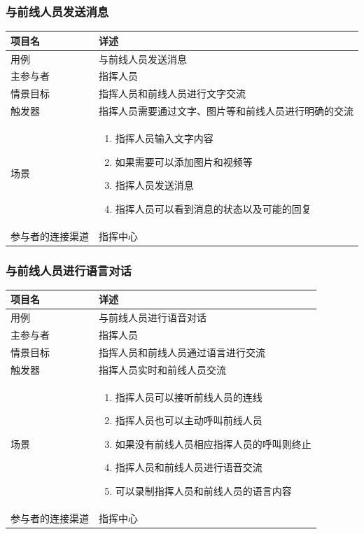 \documentclass{ctexrep}
\begin{document}
\subsubsection{与前线人员发送消息}
\begin{longtable}{p{2cm} | p{10cm}}
\hline
项目名 & 详述 \\
\hline
\hline
用例 & 与前线人员发送消息\\
\hline
主参与者 & 指挥人员 \\
\hline
情景目标 &  指挥人员和前线人员进行文字交流\\
\hline
触发器 &  指挥人员需要通过文字、图片等和前线人员进行明确的交流\\
\hline
场景 & \begin{enumerate}
	\item 指挥人员输入文字内容
	\item 如果需要可以添加图片和视频等
	\item 指挥人员发送消息
	\item 指挥人员可以看到消息的状态以及可能的回复
\end{enumerate} \\
\hline
参与者的连接渠道 & 指挥中心 \\
\hline
\end{longtable}

\subsubsection{与前线人员进行语言对话}
\begin{longtable}{p{2cm} | p{10cm}}
\hline
项目名 & 详述 \\
\hline
\hline
用例 & 与前线人员进行语音对话\\
\hline
主参与者 & 指挥人员 \\
\hline
情景目标 &  指挥人员和前线人员通过语言进行交流\\
\hline
触发器 &  指挥人员实时和前线人员交流\\
\hline
场景 & \begin{enumerate}
	\item 指挥人员可以接听前线人员的连线
	\item 指挥人员也可以主动呼叫前线人员
	\item 如果没有前线人员相应指挥人员的呼叫则终止
	\item 指挥人员和前线人员进行语音交流
	\item 可以录制指挥人员和前线人员的语言内容
\end{enumerate} \\
\hline
参与者的连接渠道 & 指挥中心 \\
\hline
\end{longtable}
\end{document}
